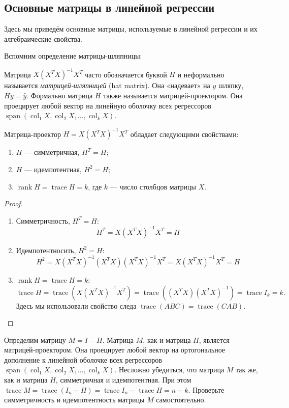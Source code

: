 \documentclass[12pt]{article}
\DeclareMathOperator{\col}{col}
\DeclareMathOperator{\trace}{trace}
\DeclareMathOperator{\rank}{rank}
\DeclareMathOperator{\Span}{span}
\begin{document}
\subsection{Основные матрицы в линейной регрессии}

Здесь мы приведём основные матрицы, используемые в линейной регрессии и их алгебраические свойства. 

Вспомним определение матрицы-шляпницы:
\begin{definition}
Матрица $X(X^TX)^{-1} X^T$ часто обозначается буквой $H$ и неформально называется \emph{матрицей-шляпницей} (hat matrix).
Она «надевает» на $y$ шляпку, $Hy = \hat y$.
Формально матрица $H$ также называется матрицей-проектором. 
Она проецирует любой вектор на линейную оболочку всех регрессоров $\Span(\col_1 X, \col_2 X, \dots, \col_k X)$.
\end{definition}

\begin{theorem}
Матрица-проектор $H = X(X^TX)^{-1}X^T$ обладает следующими свойствами:
\begin{enumerate}
    \item $H$ — симметричная, $H^T = H$;
    \item $H$ — идемпотентная, $H^2 = H$;
    \item $\rank H = \trace H = k$, где $k$ — число столбцов матрицы $X$.
\end{enumerate}
\end{theorem}
\begin{proof}

\begin{enumerate}
    \item Симметричность, $H^T = H$:
    \[
    H^T = X(X^{T}X)^{-1}X^{T} = H
    \]
    \item Идемпотентносить, $H^2 = H$:
    \[
    H^2 =  X(X^{T}X)^{-1}(X^{T}X)(X^{T}X)^{-1}X^{T} = X(X^{T}X)^{-1}X^{T} = H
    \]
    \item $\rank H = \trace H = k$:
    \[
    \trace H = \trace (X(X^{T}X)^{-1}X^{T}) = \trace ((X^{T}X)(X^{T}X)^{-1}) = \trace I_k = k.
    \]
    Здесь мы использовали свойство следа $\trace(ABC) = \trace(CAB)$.
    \end{enumerate}
\end{proof}


Определим матрицу $M = I-H$. 
Матрица $M$, как и матрица $H$, является матрицей-проектором. 
Она проецирует любой вектор на ортогональное дополнение к линейной оболочке всех регрессоров $\Span(\col_1 X, \col_2 X, \dots, \col_k X)$. 
Несложно убедиться, что матрица $M$ так же, как и матрица $H$, симметричная и идемпотентная. При этом $\trace M = \trace(I_n - H) = \trace I_n - \trace H = n - k$. 
Проверьте симметричность и идемпотентность матрицы $M$ самостоятельно.
\end{document}
